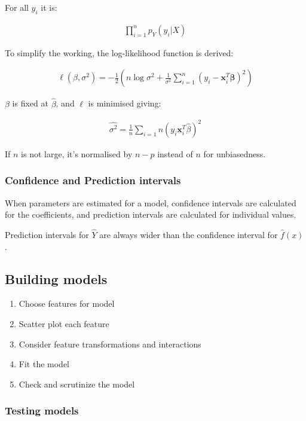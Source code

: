 \documentclass{article}
\begin{document}
For all $y_i$ it is:

\begin{align*}
    \prod_{i=1}^n p_Y(y_i|X)
\end{align*}

To simplify the working, the log-likelihood function is derived:

\begin{align*}
    \ell\left(\beta, \sigma^{2}\right)=-\frac{1}{2}\left(n \log \sigma^{2}+\frac{1}{\sigma^{2}} \sum_{i=1}^{n}\left(y_{i}-\boldsymbol{x}_{i}^{T} \boldsymbol{\beta}\right)^{2}\right)
\end{align*}

$\beta$ is fixed at $\hat{\beta}$, and $\ell$ is minimised giving:

\begin{align*}
  \hat{\sigma^2}=\frac{1}{n}\sum_{i=1}{n}(y_i\boldsymbol{x}_i^T\hat{\beta})^2  
\end{align*}

If $n$ is not large, it's normalised by $n-p$ instead of $n$ for unbiasedness.

\subsubsection{Confidence and Prediction intervals}

When parameters are estimated for a model, confidence intervals are calculated for the coefficients, and prediction intervals are calculated for individual values.

Prediction intervals for $\hat{Y}$ are always wider than the confidence interval for $\hat{f}(x)$.

\subsection{Building models}

\begin{enumerate}
    \item Choose features for model
    \item Scatter plot each feature
    \item Consider feature transformations and interactions
    \item Fit the model
    \item Check and scrutinize the model
\end{enumerate}

\subsubsection{Testing models}
\end{document}
